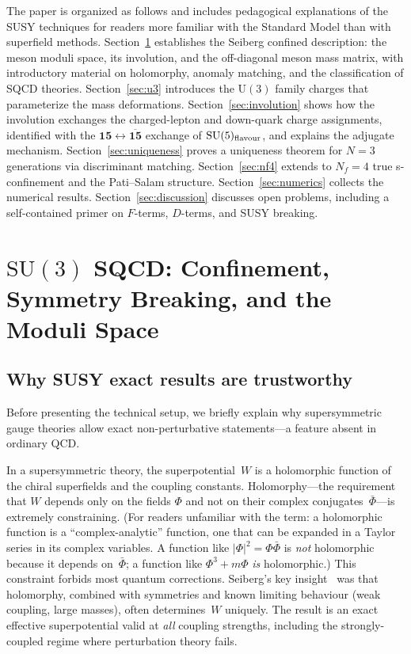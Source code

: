\documentclass[12pt,a4paper]{article}
\newcommand{\SU}{\mathrm{SU}}
\newcommand{\UU}{\mathrm{U}}
\newcommand{\Nf}{N_f}
\begin{document}
The paper is organized as follows and includes pedagogical
explanations of the SUSY techniques for readers more familiar with
the Standard Model than with superfield methods.
Section~\ref{sec:seiberg}
establishes the Seiberg confined description: the meson moduli space,
its involution, and the off-diagonal meson mass matrix, with
introductory material on holomorphy, anomaly matching, and the
classification of SQCD theories.
Section~\ref{sec:u3} introduces the $\UU(3)$ family charges that
parameterize the mass deformations. Section~\ref{sec:involution}
shows how the involution exchanges the charged-lepton and down-quark
charge assignments, identified with the $\mathbf{15} \leftrightarrow
\overline{\mathbf{15}}$ exchange of $\SU(5)_{\rm flavour}$, and
explains the adjugate mechanism.
Section~\ref{sec:uniqueness} proves a uniqueness theorem for $N=3$
generations via discriminant matching.
Section~\ref{sec:nf4} extends to $\Nf=4$ true s-confinement and the
Pati--Salam structure. Section~\ref{sec:numerics} collects
the numerical results. Section~\ref{sec:discussion} discusses
open problems, including a self-contained primer on $F$-terms,
$D$-terms, and SUSY breaking.


\section{$\SU(3)$ SQCD: Confinement, Symmetry Breaking, and the Moduli
  Space}
\label{sec:seiberg}

\subsection{Why SUSY exact results are trustworthy}

Before presenting the technical setup, we briefly explain why
supersymmetric gauge theories allow exact non-perturbative
statements---a feature absent in ordinary QCD.

In a supersymmetric theory, the superpotential~$W$ is a holomorphic
function of the chiral superfields and the coupling constants.
Holomorphy---the requirement that $W$ depends only on the fields
$\Phi$ and not on their complex conjugates~$\bar\Phi$---is extremely
constraining. (For readers unfamiliar with the term: a holomorphic
function is a ``complex-analytic'' function, one that can be
expanded in a Taylor series in its complex variables. A function
like $|\Phi|^2 = \Phi\bar\Phi$ is \emph{not} holomorphic because it
depends on~$\bar\Phi$; a function like $\Phi^3 + m\Phi$ \emph{is}
holomorphic.) This constraint forbids most quantum corrections.
Seiberg's key insight~\cite{Seiberg:1994bz} was that holomorphy,
combined with symmetries and known limiting behaviour (weak coupling,
large masses), often determines~$W$ uniquely.
The result is an exact effective superpotential valid at
\emph{all} coupling strengths, including the strongly-coupled
regime where perturbation theory fails.
\end{document}
